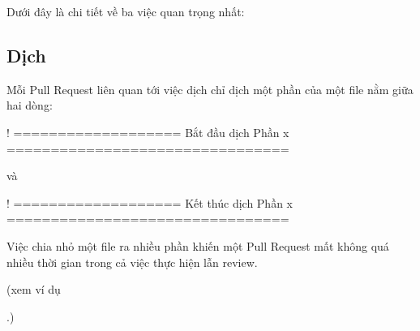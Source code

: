 \documentclass[letterpaper,11pt,english]{sphinxmanual}
\begin{document}
Dưới đây là chi tiết về ba việc quan trọng nhất:


\subsection{Dịch}
\label{\detokenize{intro_vn:dich}}
Mỗi Pull Request liên quan tới việc dịch chỉ dịch một phần của một file
 nằm giữa hai dòng:

\begin{sphinxVerbatim}[commandchars=\\\{\}]
\PYGZlt{}!\PYGZhy{}\PYGZhy{} =================== Bắt đầu dịch Phần x ================================ \PYGZhy{}\PYGZhy{}\PYGZgt{}
\end{sphinxVerbatim}

và

\begin{sphinxVerbatim}[commandchars=\\\{\}]
\PYGZlt{}!\PYGZhy{}\PYGZhy{} =================== Kết thúc dịch Phần x ================================ \PYGZhy{}\PYGZhy{}\PYGZgt{}
\end{sphinxVerbatim}

Việc chia nhỏ một file ra nhiều phần khiến một Pull Request mất không
quá nhiều thời gian trong cả việc thực hiện lẫn review.

(xem ví dụ %
\begin{footnote}[9]\sphinxAtStartFootnote
{}
%
\end{footnote}.)
\end{document}
